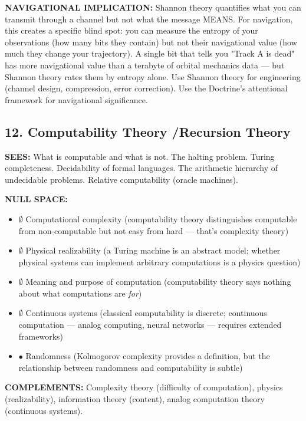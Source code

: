 \textbf{NAVIGATIONAL IMPLICATION:} Shannon theory quantifies what you can transmit through a channel but not what the message MEANS. For navigation, this creates a specific blind spot: you can measure the entropy of your observations (how many bits they contain) but not their navigational value (how much they change your trajectory). A single bit that tells you "Track A is dead" has more navigational value than a terabyte of orbital mechanics data — but Shannon theory rates them by entropy alone. Use Shannon theory for engineering (channel design, compression, error correction). Use the Doctrine's attentional framework for navigational significance.


\bigskip\noindent\makebox[\textwidth]{\color{rulegray}\rule{5cm}{0.3pt}}\bigskip


\subsection*{12. Computability Theory /\allowbreak  Recursion Theory}


\textbf{SEES:} What is computable and what is not. The halting problem. Turing completeness. Decidability of formal languages. The arithmetic hierarchy of undecidable problems. Relative computability (oracle machines).


\textbf{NULL SPACE:}

\begin{itemize}[nosep,leftmargin=*]
  \item $\emptyset$ Computational complexity (computability theory distinguishes computable from non-computable but not easy from hard — that's complexity theory)
  \item $\emptyset$ Physical realizability (a Turing machine is an abstract model; whether physical systems can implement arbitrary computations is a physics question)
  \item $\emptyset$ Meaning and purpose of computation (computability theory says nothing about what computations are \textit{for})
  \item $\emptyset$ Continuous systems (classical computability is discrete; continuous computation — analog computing, neural networks — requires extended frameworks)
  \item $\bullet$ Randomness (Kolmogorov complexity provides a definition, but the relationship between randomness and computability is subtle)
\end{itemize}


\textbf{COMPLEMENTS:} Complexity theory (difficulty of computation), physics (realizability), information theory (content), analog computation theory (continuous systems).


